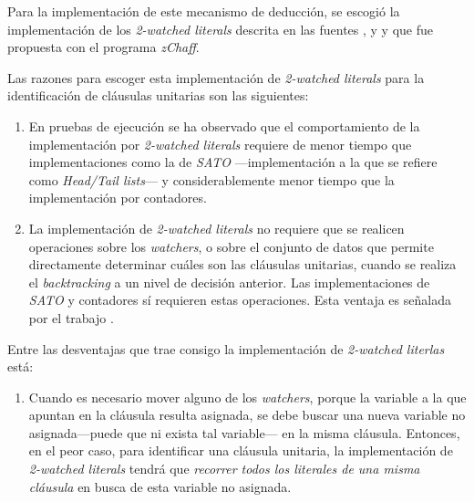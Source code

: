 \documentclass[12pt,lettersize]{article}
\begin{document}
Para la implementación de este mecanismo de deducción, se escogió la
implementación de los \emph{2-watched literals} descrita en las fuentes
\cite{Marques}, \cite{Zhang} y \cite{ZhangThesis} y que fue propuesta con el
programa \emph{zChaff}.



Las razones para escoger esta implementación de \emph{2-watched literals} para
la identificación de cláusulas unitarias son las siguientes:\vspace{-2.5mm}
\begin{enumerate}
\item En pruebas de ejecución\cite{Zhang} se ha observado que el comportamiento
  de la implementación por \emph{2-watched literals} requiere de menor tiempo
  que implementaciones como la de \emph{SATO} ---implementación a la que
  \cite{Zhang} se refiere como \emph{Head/Tail lists}--- y considerablemente
  menor tiempo que la implementación por contadores.
\item La implementación de \emph{2-watched literals} no requiere que se realicen
  operaciones sobre los \emph{watchers}, o sobre el conjunto de datos que
  permite directamente determinar cuáles son las cláusulas unitarias, cuando se
  realiza el \emph{backtracking} a un nivel de decisión anterior. Las
  implementaciones de \emph{SATO} y contadores sí requieren estas
  operaciones. Esta ventaja es señalada por el trabajo \cite{Marques}.
\end{enumerate}

Entre las desventajas que trae consigo la implementación de \emph{2-watched
  literlas} está:\vspace{-2.5mm}
\begin{enumerate}
\item Cuando es necesario mover alguno de los \emph{watchers}, porque la variable
  a la que apuntan en la cláusula resulta asignada, se debe buscar una nueva
  variable no asignada---puede que ni exista tal variable--- en la misma
  cláusula. Entonces, en el peor caso, para identificar una cláusula unitaria,
  la implementación de \emph{2-watched literals} tendrá que \emph{recorrer todos
    los literales de una misma cláusula} en busca de esta variable no asignada.
\end{enumerate}
\end{document}
